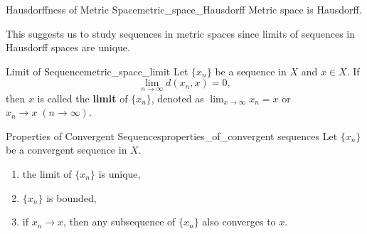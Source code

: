 \documentclass{report}
\begin{document}
\begin{proposition}{Hausdorffness of Metric Space}{metric_space_Hausdorff}
	Metric space is Hausdorff.
\end{proposition}
This suggests us to study sequences in metric spaces since limits of sequences in Hausdorff spaces are unique. 
\begin{definition}{Limit of Sequence}{metric_space_limit}
	Let $\{x_n\}$ be a sequence in $X$ and $x\in X$. If
	\[
		\lim_{n\to\infty}d(x_n,x)=0,
	\]
	then $x$ is called the \textbf{limit} of $\{x_n\}$, denoted as $\lim_{x\to\infty}x_n=x$ or $x_n\to x\;(n\to\infty)$.
\end{definition}

\begin{proposition}{Properties of Convergent Sequences}{properties_of_convergent sequences}
	Let $\{x_n\}$ be a convergent sequence in $X$.
	\begin{enumerate}
		\item the limit of $\{x_n\}$ is unique,
		\item $\{x_n\}$ is bounded,
		\item if $x_n\to x$, then any subsequence of $\{x_n\}$ also converges to $x$.
	\end{enumerate}	
\end{proposition}
\end{document}
